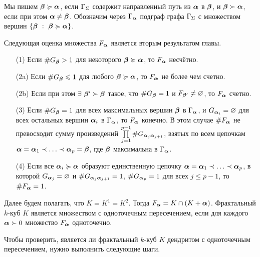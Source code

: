 Мы пишем ${\bm{\beta}}\succcurlyeq{\bm{\alpha}}$, если $\Gamma_\Sigma$ содержит направленный путь из ${\bm{\alpha}}$ в ${\bm{\beta}}$, и ${\bm{\beta}}\succ{\bm{\alpha}}$, если при этом ${\bm{\alpha}}\neq{\bm{\beta}}$.
Обозначим через $\Gamma_{\bm{\alpha}}$ подграф графа $\Gamma_\Sigma$ с множеством вершин $\{{\bm{\beta}}\ :\ {\bm{\beta}}\succcurlyeq{\bm{\alpha}}\}$.

Следующая оценка множества $F_{\bm{\alpha}}$ является вторым результатом главы.\\

{\em \begin{enumerate}[nolistsep]
\item[(1)] Если $\#G_{\bm{\beta}}>1$ для некоторого ${\bm{\beta}}\succcurlyeq{\bm{\alpha}}$, то $F_{\bm{\alpha}}$ несчётно.
\item[(2a)] Если $\#G_{\bm{\beta}}\leqslant1$ для любого ${\bm{\beta}}\succcurlyeq{\bm{\alpha}}$, то $F_{\bm{\alpha}}$ не более чем счетно.
\item[(2b)] Если при этом $\exists\ {\bm{\beta}}'\succ{\bm{\beta}}$ такое, что $\#G_{\bm{\beta}}=1$ и $F_{{\bm{\beta}}'}\neq\varnothing$, то $F_{\bm{\alpha}}$ счетно.
\item[(3)] Если $\#G_{\bm{\beta}}=1$ для всех максимальных вершин ${\bm{\beta}}$ в $\Gamma_{\bm{\alpha}}$, и $G_{{\bm{\alpha}}_i}=\varnothing$ для всех остальных вершин ${\bm{\alpha}}_i$ в $\Gamma_{\bm{\alpha}}$, то $F_{\bm{\alpha}}$ конечно.
В этом случае $\#F_{\bm{\alpha}}$ не превосходит сумму произведений $\prod \limits_{j=1}^{p-1}\# G_{{\bm{\alpha}}_j{\bm{\alpha}}_{j+1}}$, взятых по всем цепочкам ${\bm{\alpha}}={\bm{\alpha}}_1\prec\ldots\prec{\bm{\alpha}}_p={\bm{\beta}}$, где ${\bm{\beta}}$ максимальна в $\Gamma_{\bm{\alpha}}$.
\item[(4)] Если все ${\bm{\alpha}}_i\succcurlyeq{\bm{\alpha}}$ образуют единственную цепочку ${\bm{\alpha}}={\bm{\alpha}}_1\prec\ldots\prec{\bm{\alpha}}_p$, в которой $G_{{\bm{\alpha}}_j}=\varnothing$ и $\# G_{{\bm{\alpha}}_j{\bm{\alpha}}_{j+1}}=1$, $\#G_{{\bm{\alpha}}_p}=1$ для всех $j\le p-1$, то $\#F_{\bm{\alpha}}=1$.
\end{enumerate} \quad}

Далее будем полагать, что $K=K^1=K^2$.
Тогда $F_{\bm{\alpha}}=K\cap(K+{\bm{\alpha}})$.
Фрактальный $k$-куб $K$ является множеством с одноточечным пересечением, если для каждого ${\bm{\alpha}}\succ0$ множество $F_{\bm{\alpha}}$ одноточечно.

Чтобы проверить, является ли фрактальный $k$-куб $K$ дендритом с одноточечным пересечением, нужно выполнить следующие шаги.\\

